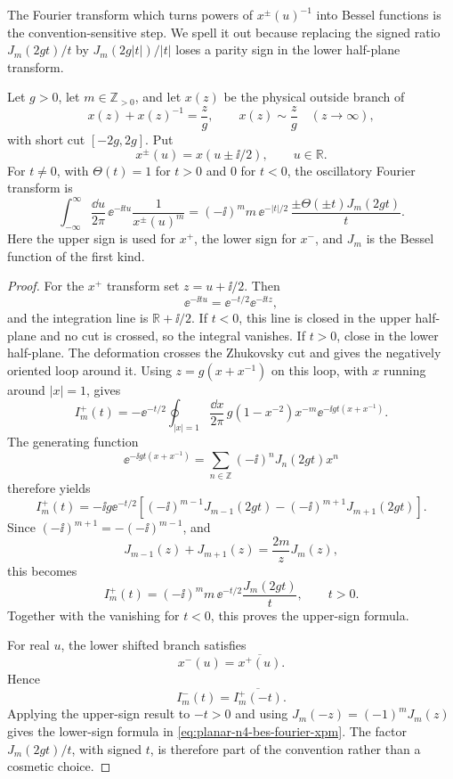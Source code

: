 The Fourier transform which turns powers of \(x^\pm(u)^{-1}\) into Bessel
functions is the convention-sensitive step.  We spell it out because replacing
the signed ratio \(J_m(2gt)/t\) by \(J_m(2g|t|)/|t|\) loses a parity sign in
the lower half-plane transform.

\begin{lemma}
\label{lem:planar-n4-bes-fourier-xpm}
Let \(g>0\), let \(m\in\mathbb Z_{>0}\), and let \(x(z)\) be the physical
outside branch of
\[
  x(z)+x(z)^{-1}=\frac{z}{g},
  \qquad x(z)\sim \frac{z}{g}\quad (z\to\infty),
\]
with short cut \([-2g,2g]\).  Put
\[
  x^\pm(u)=x(u\pm \ii/2),
  \qquad u\in\mathbb R .
\]
For \(t\neq0\), with \(\Theta(t)=1\) for \(t>0\) and \(0\) for \(t<0\),
the oscillatory Fourier transform is
\begin{equation}
  \int_{-\infty}^{\infty}\frac{\dd u}{2\pi}\,
  \ee^{-\ii t u}\frac1{x^\pm(u)^m}
  =
  (-\ii)^m m\,\ee^{-|t|/2}\,
  \frac{\pm\Theta(\pm t)J_m(2gt)}{t}.
  \label{eq:planar-n4-bes-fourier-xpm}
\end{equation}
Here the upper sign is used for \(x^+\), the lower sign for \(x^-\), and
\(J_m\) is the Bessel function of the first kind.
\end{lemma}

\begin{proof}
For the \(x^+\) transform set \(z=u+\ii/2\).  Then
\[
  \ee^{-\ii t u}=\ee^{-t/2}\ee^{-\ii t z},
\]
and the integration line is \(\mathbb R+\ii/2\).  If \(t<0\), this line is
closed in the upper half-plane and no cut is crossed, so the integral
vanishes.  If \(t>0\), close in the lower half-plane.  The deformation crosses
the Zhukovsky cut and gives the negatively oriented loop around it.  Using
\(z=g(x+x^{-1})\) on this loop, with \(x\) running around \(|x|=1\), gives
\[
  I_m^+(t)
  =
  -\ee^{-t/2}\oint_{|x|=1}\frac{\dd x}{2\pi}\,
  g(1-x^{-2})x^{-m}\ee^{-\ii gt(x+x^{-1})}.
\]
The generating function
\[
  \ee^{-\ii gt(x+x^{-1})}
  =
  \sum_{n\in\mathbb Z}(-\ii)^nJ_n(2gt)x^n
\]
therefore yields
\[
  I_m^+(t)
  =
  -\ii g\ee^{-t/2}
  \left[(-\ii)^{m-1}J_{m-1}(2gt)
        -(-\ii)^{m+1}J_{m+1}(2gt)\right].
\]
Since \((-\ii)^{m+1}=-(-\ii)^{m-1}\), and
\[
  J_{m-1}(z)+J_{m+1}(z)=\frac{2m}{z}J_m(z),
\]
this becomes
\[
  I_m^+(t)=(-\ii)^m m\,\ee^{-t/2}\frac{J_m(2gt)}{t},
  \qquad t>0.
\]
Together with the vanishing for \(t<0\), this proves the upper-sign formula.

For real \(u\), the lower shifted branch satisfies
\[
  x^-(u)=\overline{x^+(u)}.
\]
Hence
\[
  I_m^-(t)=\overline{I_m^+(-t)}.
\]
Applying the upper-sign result to \(-t>0\) and using
\(J_m(-z)=(-1)^mJ_m(z)\) gives the lower-sign formula in
\eqref{eq:planar-n4-bes-fourier-xpm}.  The factor \(J_m(2gt)/t\), with
signed \(t\), is therefore part of the convention rather than a cosmetic
choice.
\end{proof}

